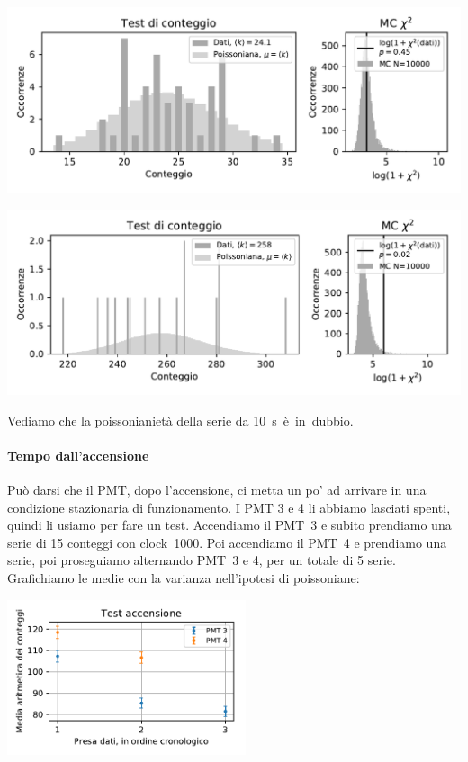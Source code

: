\documentclass[a4paper]{article}
\begin{document}
\noindent\includegraphics[width=\textwidth]{fig6a}

\noindent\includegraphics[width=\textwidth]{fig6b}

Vediamo che la poissonianietà della serie da \SI{10}s è in dubbio.

\paragraph{Tempo dall'accensione}

Può darsi che il PMT, dopo l'accensione, ci metta un po' ad arrivare in una condizione stazionaria di funzionamento.
I PMT 3 e 4 li abbiamo lasciati spenti, quindi li usiamo per fare un test.
Accendiamo il PMT~3 e subito prendiamo una serie di 15 conteggi con clock~1000.
Poi accendiamo il PMT~4 e prendiamo una serie, poi proseguiamo alternando PMT~3 e 4,
per un totale di 5 serie. Grafichiamo le medie con la varianza nell'ipotesi di poissoniane:

\includegraphics[width=7cm]{fig6c}
\end{document}
